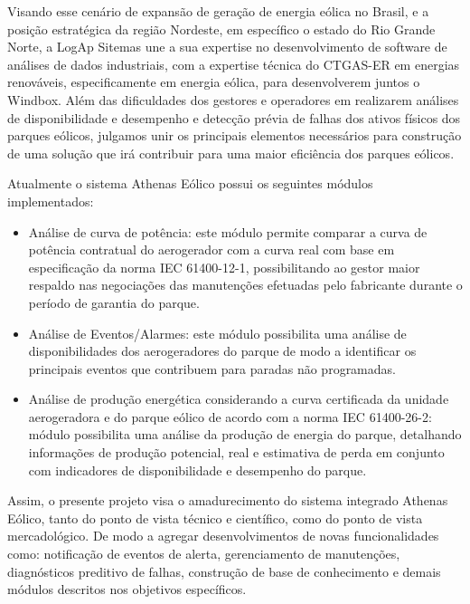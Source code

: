 
\label{Cap:TrabalhosRelacionados}

Visando esse cenário de expansão de geração de energia eólica no Brasil, e a posição estratégica da região Nordeste, em específico o estado do Rio Grande Norte, a LogAp Sitemas une a sua  expertise no desenvolvimento de software de análises de dados industriais, com a expertise técnica do CTGAS-ER em energias renováveis, especificamente em energia eólica, para desenvolverem juntos o Windbox. Além das dificuldades dos gestores e operadores em realizarem análises de disponibilidade e desempenho  e detecção prévia de falhas dos ativos físicos dos parques eólicos, julgamos unir os principais elementos necessários para construção de uma solução que irá contribuir para uma maior eficiência dos parques eólicos.



Atualmente o sistema Athenas Eólico possui os seguintes módulos implementados:
\begin{itemize}
	\item Análise de curva de potência: este módulo permite comparar a curva de potência contratual do aerogerador com a curva real com base em especificação da norma IEC 61400-12-1, possibilitando ao gestor maior respaldo nas negociações das manutenções efetuadas pelo fabricante durante o período de garantia do parque.
	\item Análise de Eventos/Alarmes: este módulo possibilita uma análise de disponibilidades dos aerogeradores do parque de modo a identificar os principais eventos que contribuem para paradas não programadas.
	\item Análise de produção energética considerando a curva certificada da unidade aerogeradora e do parque eólico de acordo com a norma IEC 61400-26-2: módulo possibilita uma análise da produção de energia do parque, detalhando informações de produção potencial, real e estimativa de perda em conjunto com indicadores de disponibilidade e desempenho do parque.
\end{itemize}
Assim, o presente projeto visa o amadurecimento do sistema integrado Athenas Eólico, tanto do ponto de vista técnico e científico, como do ponto de vista mercadológico. De modo a agregar desenvolvimentos de novas funcionalidades como: notificação de eventos de alerta, gerenciamento de manutenções, diagnósticos preditivo de falhas, construção de base de conhecimento e demais módulos descritos nos objetivos específicos.

